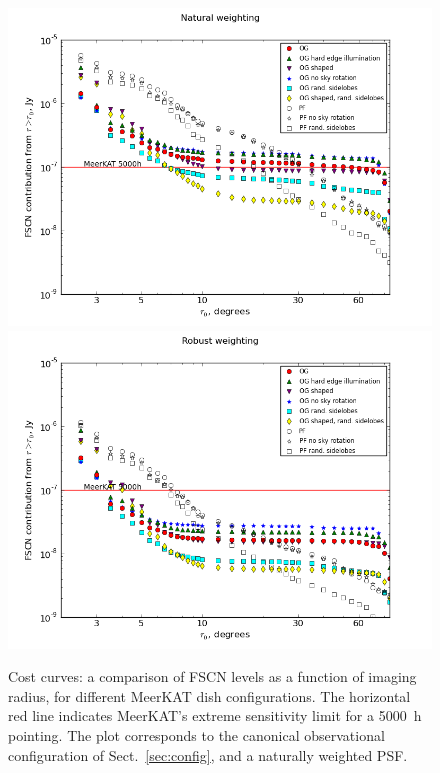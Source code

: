 \documentclass{aa}
\begin{document}
\begin{figure}
  \includegraphics[width=\columnwidth]{costcurve-main}\hfill
  \includegraphics[width=\columnwidth]{costcurve-main-robust}
\caption{\label{fig:cc-main}Cost curves: a comparison of FSCN levels as a function of imaging radius, for different MeerKAT dish configurations. The horizontal red line indicates MeerKAT's extreme sensitivity limit for a 5000~h pointing. The plot corresponds to the canonical observational configuration of Sect.~\ref{sec:config}, and a naturally weighted PSF.}
\end{figure}
\end{document}
